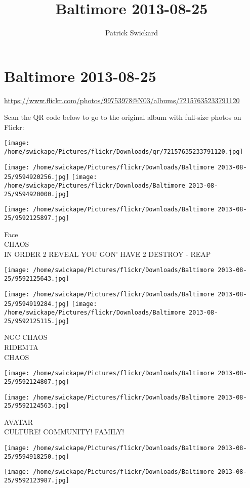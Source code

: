 \documentclass[10pt,letterpaper]{article}
\title{Baltimore 2013-08-25}
\author{Patrick Swickard}
\date{}
\begin{document}
\section*{Baltimore 2013-08-25}

\url{https://www.flickr.com/photos/99753978@N03/albums/72157635233791120}

Scan the QR code below to go to the original album with full-size photos on Flickr:

\texttt{[image: /home/swickape/Pictures/flickr/Downloads/qr/72157635233791120.jpg]}
\pagebreak

\texttt{[image: /home/swickape/Pictures/flickr/Downloads/Baltimore 2013-08-25/9594920256.jpg]}
\texttt{[image: /home/swickape/Pictures/flickr/Downloads/Baltimore 2013-08-25/9594920000.jpg]}

\texttt{[image: /home/swickape/Pictures/flickr/Downloads/Baltimore 2013-08-25/9592125897.jpg]}

Face\\
CHAOS\\
IN ORDER 2 REVEAL YOU GON' HAVE 2 DESTROY {-} REAP
\pagebreak

\texttt{[image: /home/swickape/Pictures/flickr/Downloads/Baltimore 2013-08-25/9592125643.jpg]}

\vspace{0.25in}
\texttt{[image: /home/swickape/Pictures/flickr/Downloads/Baltimore 2013-08-25/9594919284.jpg]}
\texttt{[image: /home/swickape/Pictures/flickr/Downloads/Baltimore 2013-08-25/9592125115.jpg]}

NGC CHAOS\\
RIDEMTA\\
CHAOS
\pagebreak

\texttt{[image: /home/swickape/Pictures/flickr/Downloads/Baltimore 2013-08-25/9592124807.jpg]}

\vspace{0.25in}
\texttt{[image: /home/swickape/Pictures/flickr/Downloads/Baltimore 2013-08-25/9592124563.jpg]}

AVATAR\\
CULTURE! COMMUNITY! FAMILY!
\pagebreak

\texttt{[image: /home/swickape/Pictures/flickr/Downloads/Baltimore 2013-08-25/9594918250.jpg]}

\vspace{0.25in}
\texttt{[image: /home/swickape/Pictures/flickr/Downloads/Baltimore 2013-08-25/9592123987.jpg]}
\end{document}
